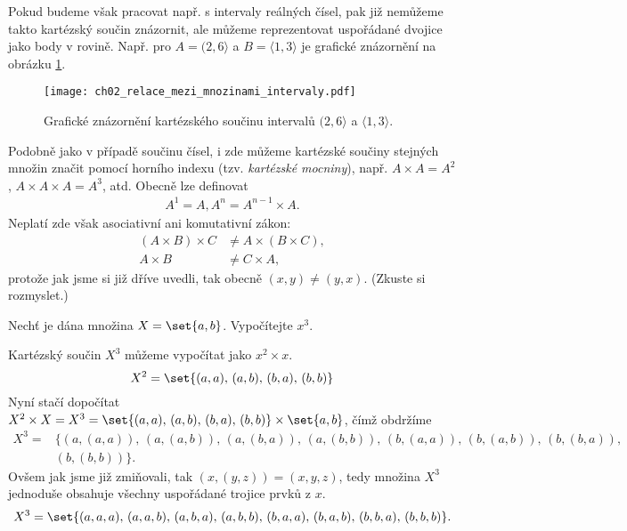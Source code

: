 Pokud budeme však pracovat např. s intervaly reálných čísel, pak již nemůžeme takto kartézský součin znázornit, ale můžeme reprezentovat uspořádané dvojice jako body v rovině. Např. pro $A=(2, 6\rangle$ a $B=\langle 1,3 \rangle$ je grafické znázornění na obrázku \ref{fig:kartezsky_soucin_intervaly}.
\begin{figure}[H]
    \centering
    \texttt{[image: ch02\_relace\_mezi\_mnozinami\_intervaly.pdf]}
    \caption{Grafické znázornění kartézského součinu intervalů $(2, 6\rangle$ a $\langle 1,3 \rangle$.}
    \label{fig:kartezsky_soucin_intervaly}
\end{figure}
Podobně jako v případě součinu čísel, i zde můžeme kartézské součiny stejných množin značit pomocí horního indexu (tzv. \emph{kartézské mocniny}), např. $A\times A=A^2$, $A\times A\times A=A^3$, atd. Obecně lze definovat
\begin{align*}
    A^1=A,
    A^n=A^{n-1}\times A.
\end{align*}
Neplatí zde však asociativní ani komutativní zákon:
\begin{align*}
    (A\times B)\times C&\neq A\times (B\times C),\\
    A\times B&\neq C\times A,
\end{align*}
protože jak jsme si již dříve uvedli, tak obecně $(x,y)\neq (y,x)$. (Zkuste si rozmyslet.)
\begin{example}
    Nechť je dána množina $X=\set{a,b}$. Vypočítejte $x^3$.
\end{example}
\begin{solution}
    Kartézský součin $X^3$ můžeme vypočítat jako $x^2\times x$.
    \begin{equation*}
        X^2=\set{(a,a),\,(a,b),\,(b,a),\,(b,b)}
    \end{equation*}
    Nyní stačí dopočítat $X^2\times X=X^3=\set{(a,a),\,(a,b),\,(b,a),\,(b,b)}\times\set{a,b}$, čímž obdržíme
    \begin{align*}
        X^3=&\{(a,(a,a)),\,(a,(a,b)),\,(a,(b,a)),\,(a,(b,b)),\,(b,(a,a)),\,(b,(a,b)),\,(b,(b,a)),\\
        &(b,(b,b))\}.
    \end{align*}
    Ovšem jak jsme již zmiňovali, tak $(x,(y,z))=(x,y,z)$, tedy množina $X^3$ jednoduše obsahuje všechny uspořádané trojice prvků z $x$.
    \begin{equation*}
        X^3=\set{(a,a,a),\,(a,a,b),\,(a,b,a),\,(a,b,b),\,(b,a,a),\,(b,a,b),\,(b,b,a),\,(b,b,b)}.
    \end{equation*}
\end{solution}

